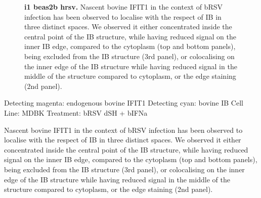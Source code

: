 \begin{figure}
\begin{subfigure}{1\textwidth}
    \end{subfigure}
    \caption[i1 beas2b hrsv]{\textbf{i1 beas2b hrsv.} Nascent bovine IFIT1 in the context of bRSV infection has been observed to localise with the respect of IB in three distinct spaces. We observed it either concentrated inside the central point of the IB structure, while having reduced signal on the inner IB edge, compared to the cytoplasm (top and bottom panels), being excluded from the IB structure (3rd panel), or colocalising on the inner edge of the IB structure while having reduced signal in the middle of the structure compared to cytoplasm, or the edge staining (2nd panel).}
    \label{fig:i1 beas2b hrsv}
\end{figure}

Detecting magenta: endogenous bovine IFIT1 \newline
Detecting cyan: bovine IB \newline
Cell Line: MDBK \newline
Treatment: bRSV dSH + bIFNa \newline

Nascent bovine IFIT1 in the context of bRSV infection has been observed to localise with the respect of IB in three distinct spaces. We observed it either concentrated inside the central point of the IB structure, while having reduced signal on the inner IB edge, compared to the cytoplasm (top and bottom panels), being excluded from the IB structure (3rd panel), or colocalising on the inner edge of the IB structure while having reduced signal in the middle of the structure compared to cytoplasm, or the edge staining (2nd panel).

